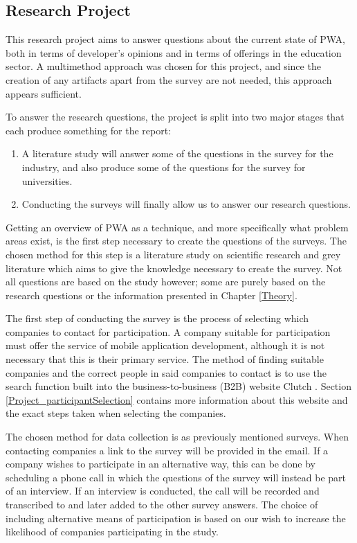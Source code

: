 \documentclass[a4paper,12pt]{article}
\begin{document}
\subsection{Research Project}
\label{Method_project}
This research project aims to answer questions about the current state of PWA, both in terms of developer’s opinions and in terms of offerings in the education sector. A multimethod approach was chosen for this project, and since the creation of any artifacts apart from the survey are not needed, this approach appears sufficient.

To answer the research questions, the project is split into two major stages that each produce something for the report:

\begin{enumerate}
    \item A literature study will answer some of the questions in the survey for the industry, and also produce some of the questions for the survey for universities.
    \item Conducting the surveys will finally allow us to answer our research questions.
\end{enumerate}

Getting an overview of PWA as a technique, and more specifically what problem areas exist, is the first step necessary to create the questions of the surveys. The chosen method for this step is a literature study on scientific research and grey literature which aims to give the knowledge necessary to create the survey. Not all questions are based on the study however; some are purely based on the research questions or the information presented in Chapter \ref{Theory}.

The first step of conducting the survey is the process of selecting which companies to contact for participation. A company suitable for participation must offer the service of mobile application development, although it is not necessary that this is their primary service. The method of finding suitable companies and the correct people in said companies to contact is to use the search function built into the business-to-business (B2B) website Clutch \cite{clutch}. Section \ref{Project_participantSelection} contains more information about this website and the exact steps taken when selecting the companies.

The chosen method for data collection is as previously mentioned surveys. When contacting companies a link to the survey will be provided in the email. If a company wishes to participate in an alternative way, this can be done by scheduling a phone call in which the questions of the survey will instead be part of an interview. If an interview is conducted, the call will be recorded and transcribed to and later added to the other survey answers. The choice of including alternative means of participation is based on our wish to increase the likelihood of companies participating in the study.
\end{document}
